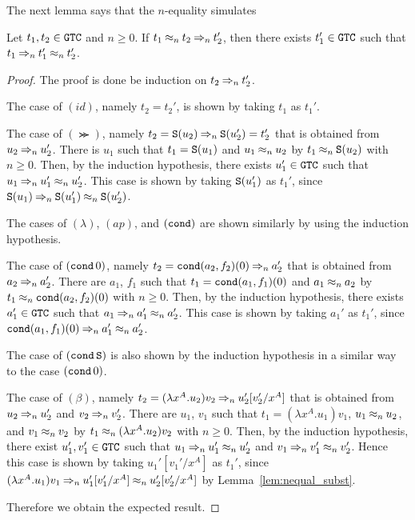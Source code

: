 The next lemma says that the $n$-equality simulates 
\begin{lemma}\label{lem:parallel_eq}
  Let $t_1, t_2 \in {\tt GTC}$ and $n\ge 0$.
  If $t_1 \mathbin{\approx_{n}} t_2 \mathbin{\Rightarrow_{n}} t_2'$,
  then there exists $t_1'\in {\tt GTC}$ such that $t_1 \mathbin{\Rightarrow_{n}} t_1' \mathbin{\approx_{n}} t_2'$.
\end{lemma}
\begin{proof}
  The proof is done be induction on $t_2 \mathbin{\Rightarrow_{n}} t_2'$.
  
  The case of $(id)$, namely $t_2=t_2'$, is shown by taking $t_1$ as $t_1'$.
  
  The case of $(\Succ)$, namely $t_2={\tt S}(u_2) \mathbin{\Rightarrow_{n}} {\tt S}(u_2')=t_2'$ that is obtained
  from $u_2\mathbin{\Rightarrow_{n}} u_2'$. 
  There is $u_1$ such that $t_1 = {\tt S}(u_1)$ and $u_1\mathbin{\approx_{n}} u_2$ by $t_1 \mathbin{\approx_{n}} {\tt S}(u_2)$ with $n\ge 0$.
  Then, by the induction hypothesis,
  there exists $u_1'\in{\tt GTC}$ such that $u_1 \mathbin{\Rightarrow_{n}} u_1' \mathbin{\approx_{n}} u_2'$.  
  This case is shown by taking ${\tt S}(u_1')$ as $t_1'$,
  since ${\tt S}(u_1) \mathbin{\Rightarrow_{n}} {\tt S}(u_1') \mathbin{\approx_{n}} {\tt S}(u_2')$.
  
  The cases of $(\lambda)$, $(ap)$, and $({\tt cond})$ are shown similarly by using the induction hypothesis.
  
  The case of $({\tt cond}\,0)$, namely $t_2 = {\tt cond}(a_2,f_2)(0) \mathbin{\Rightarrow_{n}} a_2'$ that is
  obtained from $a_2 \mathbin{\Rightarrow_{n}} a_2'$.
  There are $a_1$, $f_1$ such that $t_1 = {\tt cond}(a_1,f_1)(0)$ and $a_1 \mathbin{\approx_{n}} a_2$
  by $t_1 \mathbin{\approx_{n}} {\tt cond}(a_2,f_2)(0)$ with $n\ge 0$.
  Then, by the induction hypothesis,
  there exists $a_1'\in{\tt GTC}$ such that $a_1 \mathbin{\Rightarrow_{n}} a_1' \mathbin{\approx_{n}} a_2'$.  
  This case is shown by taking $a_1'$ as $t_1'$,
  since ${\tt cond}(a_1,f_1)(0) \mathbin{\Rightarrow_{n}} a_1' \mathbin{\approx_{n}} a_2'$.  

  The case of $({\tt cond}\,{\tt S})$ is also shown by the induction hypothesis in a similar way to the case $({\tt cond}\,0)$.
  
  The case of $(\beta)$, namely $t_2 = (\lambda x^A.u_2)v_2 \mathbin{\Rightarrow_{n}} u_2'[v_2'/x^A]$ that is 
  obtained from $u_2 \mathbin{\Rightarrow_{n}} u_2'$ and $v_2 \mathbin{\Rightarrow_{n}} v_2'$.
  There are $u_1$, $v_1$ such that $t_1 = (\lambda x^A.u_1)v_1$, $u_1 \mathbin{\approx_{n}} u_2$, and $v_1 \mathbin{\approx_{n}} v_2$
  by $t_1 \mathbin{\approx_{n}} (\lambda x^A.u_2)v_2$ with $n\ge 0$.
  Then, by the induction hypothesis,
  there exist $u_1',v_1'\in{\tt GTC}$ such that $u_1 \mathbin{\Rightarrow_{n}} u_1' \mathbin{\approx_{n}} u_2'$ and
  $v_1 \mathbin{\Rightarrow_{n}} v_1' \mathbin{\approx_{n}} v_2'$.
  Hence this case is shown by taking $u_1'[v_1'/x^A]$ as $t_1'$,
  since $(\lambda x^A.u_1)v_1 \mathbin{\Rightarrow_{n}} u_1'[v_1'/x^A] \mathbin{\approx_{n}} u_2'[v_2'/x^A]$ by Lemma~\ref{lem:nequal_subst}.
  
  Therefore we obtain the expected result. 
\end{proof}


